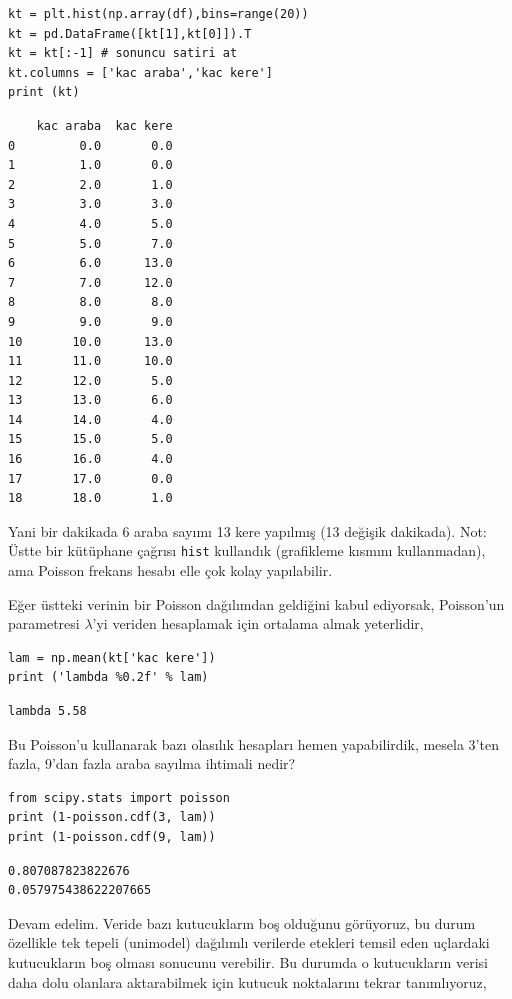 \documentclass[12pt,fleqn]{article}\usepackage{../../common}
\begin{document}
\begin{verbatim}
kt = plt.hist(np.array(df),bins=range(20))
kt = pd.DataFrame([kt[1],kt[0]]).T
kt = kt[:-1] # sonuncu satiri at
kt.columns = ['kac araba','kac kere']
print (kt)
\end{verbatim}

\begin{verbatim}
    kac araba  kac kere
0         0.0       0.0
1         1.0       0.0
2         2.0       1.0
3         3.0       3.0
4         4.0       5.0
5         5.0       7.0
6         6.0      13.0
7         7.0      12.0
8         8.0       8.0
9         9.0       9.0
10       10.0      13.0
11       11.0      10.0
12       12.0       5.0
13       13.0       6.0
14       14.0       4.0
15       15.0       5.0
16       16.0       4.0
17       17.0       0.0
18       18.0       1.0
\end{verbatim}

Yani bir dakikada 6 araba sayımı 13 kere yapılmış (13 değişik dakikada).
Not: Üstte bir kütüphane çağrısı \verb!hist! kullandık (grafikleme kısmını
kullanmadan), ama Poisson frekans hesabı elle çok kolay yapılabilir.

Eğer üstteki verinin bir Poisson dağılımdan geldiğini kabul ediyorsak,
Poisson'un parametresi $\lambda$'yi veriden hesaplamak için ortalama
almak yeterlidir,

\begin{verbatim}
lam = np.mean(kt['kac kere'])
print ('lambda %0.2f' % lam)
\end{verbatim}

\begin{verbatim}
lambda 5.58
\end{verbatim}

Bu Poisson'u kullanarak bazı olasılık hesapları hemen yapabilirdik, mesela
3'ten fazla, 9'dan fazla araba sayılma ihtimali nedir?

\begin{verbatim}
from scipy.stats import poisson
print (1-poisson.cdf(3, lam))
print (1-poisson.cdf(9, lam))
\end{verbatim}

\begin{verbatim}
0.807087823822676
0.057975438622207665
\end{verbatim}

Devam edelim. Veride bazı kutucukların boş olduğunu görüyoruz, bu durum
özellikle tek tepeli (unimodel) dağılımlı verilerde etekleri temsil eden
uçlardaki kutucukların boş olması sonucunu verebilir. Bu durumda o kutucukların
verisi daha dolu olanlara aktarabilmek için kutucuk noktalarını tekrar
tanımlıyoruz,
\end{document}
